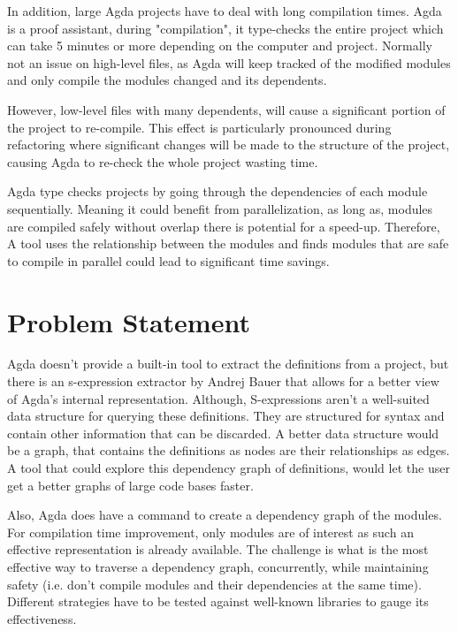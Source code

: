 In addition, large Agda projects have to deal with long compilation times. Agda
is a proof assistant, during "compilation", it type-checks the entire project
which can take 5 minutes or more depending on the computer and project.
Normally not an issue on high-level files, as Agda will keep tracked of the
modified modules and only compile the modules changed and its dependents.

However, low-level files with many dependents, will cause a significant portion
of the project to re-compile. This effect is particularly pronounced during
refactoring where significant changes will be made to the structure of the
project, causing Agda to re-check the whole project wasting time. 

Agda type checks projects by going through the dependencies of each module
sequentially. Meaning it could benefit from parallelization, as long as,
modules are compiled safely without overlap there is potential for a speed-up.
Therefore, A tool uses the relationship between the modules and finds modules
that are safe to compile in parallel could lead to significant time savings.

\section{Problem Statement}

Agda doesn't provide a built-in tool to extract the definitions from a project,
but there is an s-expression extractor by Andrej Bauer \cite{andrej} that
allows for a better view of Agda's internal representation. Although,
S-expressions aren't a well-suited data structure for querying these
definitions. They are structured for syntax and contain other information that
can be discarded. A better data structure would be a graph, that contains the
definitions as nodes are their relationships as edges. A tool that could
explore this dependency graph of definitions, would let the user get a better
graphs of large code bases faster.

Also, Agda does have a command to create a dependency graph of the modules. For
compilation time improvement, only modules are of interest as such an effective
representation is already available. The challenge is what is the most
effective way to traverse a dependency graph, concurrently, while maintaining
safety (i.e. don't compile modules and their dependencies at the same time).
Different strategies have to be tested against well-known libraries to gauge
its effectiveness. 


